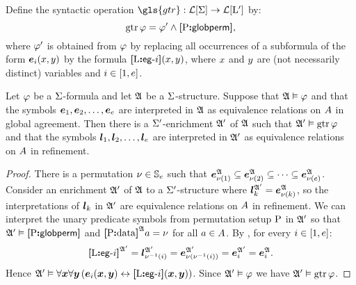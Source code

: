 \begin{definition}
Define the syntactic operation $\gls{gtr} : \FoF\SigS \to \FoF\LSp$ by:
\[
  \operatorname{gtr}\varphi = {\varphi'} \land {\bm{[}{\mathrm{P}}\mathord{\bm{:}}\mathsf{globperm}\bm{]}},
\]
where ${\varphi'}$ is obtained from $\varphi$ by replacing all occurrences of a
subformula of the form $\bm{e}_{i}(x,y)$ by the formula ${\bm{[}{\mathrm{L}}\mathord{\bm{:}}\mathsf{eg}{\hbox{-}}i\bm{]}}(x,y)$, 
where $x$ and $y$ are (not necessarily distinct) variables and
$i \in [1,e]$.
\end{definition}

\begin{remark}\label{rem:global-e-to-m}
Let $\varphi$ be a $\mathrm{\Sigma}$-formula and let $\mathfrak{A}$ be a $\mathrm{\Sigma}$-structure.
Suppose that $\mathfrak{A} \vDash \varphi$ and that the symbols 
$\bm{e}_{1},\bm{e}_{2},\dots,\bm{e}_{e}$ are interpreted in $\mathfrak{A}$ as equivalence
relations on $A$ in global agreement.
Then there is a $\mathrm{\Sigma'}$-enrichment $\mathfrak{A'}$ of $\mathfrak{A}$
such that $\mathfrak{A'} \vDash \operatorname{gtr}\varphi$ and that the symbols
$\bm{l}_{1},\bm{l}_{2},\dots,\bm{l}_{e}$ are interpreted in $\mathfrak{A'}$ as equivalence
relations on $A$ in refinement.
\end{remark}
\begin{proof}
There is a permutation $\nu \in \mathbb{S}_{e}$ such that
$\bm{e}_{\nu(1)}^{\mathfrak{A}} \subseteq
\bm{e}_{\nu(2)}^{\mathfrak{A}} \subseteq
\dots \subseteq
\bm{e}_{\nu(e)}^{\mathfrak{A}}$.
Consider an enrichment $\mathfrak{A'}$ of $\mathfrak{A}$
to a $\mathrm{\Sigma'}$-structure where 
$\bm{l}_{k}^{\mathfrak{A'}} = \bm{e}_{\nu(k)}^{\mathfrak{A}}$,
so the interpretations of $\bm{l}_{k}$ in $\mathfrak{A'}$ 
are equivalence relations on $A$ in refinement.
We can interpret the unary predicate symbols from permutation setup 
${\mathrm{P}}$ in $\mathfrak{A'}$ so that 
$\mathfrak{A'} \vDash {\bm{[}{\mathrm{P}}\mathord{\bm{:}}\mathsf{globperm}\bm{]}}$ and 
${\bm{[}{\mathrm{P}}\mathord{\bm{:}}\mathrm{data}\bm{]}}^{\mathfrak{A}}a = \nu$ for all $a \in A$.
By , for every $i \in [1,e]$:
\[
  {\bm{[}{\mathrm{L}}\mathord{\bm{:}}\mathsf{eg}{\hbox{-}}i\bm{]}}^{\mathfrak{A'}} =
  \bm{l}_{\nu^{-1}(i)}^{\mathfrak{A'}} =
  \bm{e}_{\nu(\nu^{-1}(i))}^{\mathfrak{A'}} =
  \bm{e}_{i}^{\mathfrak{A'}} =
  \bm{e}_{i}^{\mathfrak{A}}.
\]
Hence $\mathfrak{A'} \vDash
  \forall\bm{x}\forall\bm{y}
  \left(\bm{e}_{i}(\bm{x},\bm{y}) \leftrightarrow {\bm{[}{\mathrm{L}}\mathord{\bm{:}}\mathsf{eg}{\hbox{-}}i\bm{]}}(\bm{x},\bm{y})\right)$.
Since $\mathfrak{A'} \vDash \varphi$ we have $\mathfrak{A'} \vDash \operatorname{gtr}\varphi$.
\end{proof}


